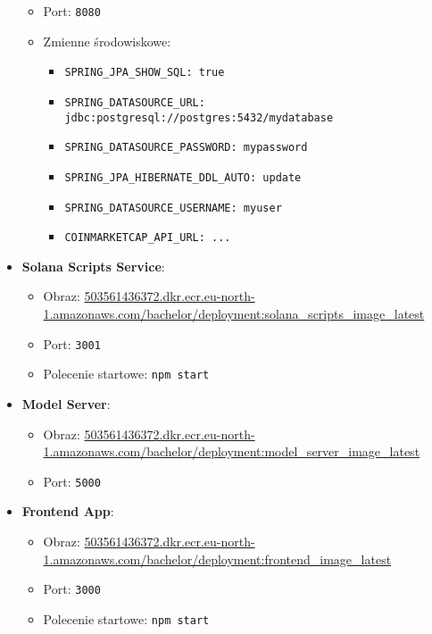 \begin{itemize}
\begin{itemize}
        \item Port: \texttt{8080}
        \item Zmienne środowiskowe:
        \begin{itemize}
            \item \texttt{SPRING\_JPA\_SHOW\_SQL: true}
            \item \texttt{SPRING\_DATASOURCE\_URL: jdbc:postgresql://postgres:5432/mydatabase}
            \item \texttt{SPRING\_DATASOURCE\_PASSWORD: mypassword}
            \item \texttt{SPRING\_JPA\_HIBERNATE\_DDL\_AUTO: update}
            \item \texttt{SPRING\_DATASOURCE\_USERNAME: myuser}
            \item \texttt{COINMARKETCAP\_API\_URL: ...}
        \end{itemize}
    \end{itemize}
    \item \textbf{Solana Scripts Service}:
    \begin{itemize}
        \item Obraz: \url{503561436372.dkr.ecr.eu-north-1.amazonaws.com/bachelor/deployment:solana_scripts_image_latest}
        \item Port: \texttt{3001}
        \item Polecenie startowe: \texttt{npm start}
    \end{itemize}
    \item \textbf{Model Server}:
    \begin{itemize}
        \item Obraz: \url{503561436372.dkr.ecr.eu-north-1.amazonaws.com/bachelor/deployment:model_server_image_latest}
        \item Port: \texttt{5000}
    \end{itemize}
    \item \textbf{Frontend App}:
    \begin{itemize}
        \item Obraz: \url{503561436372.dkr.ecr.eu-north-1.amazonaws.com/bachelor/deployment:frontend_image_latest}
        \item Port: \texttt{3000}
        \item Polecenie startowe: \texttt{npm start}
    \end{itemize}
\end{itemize}

